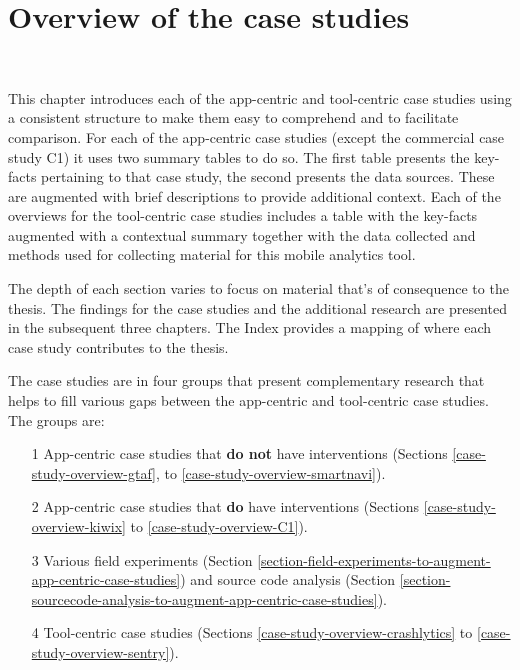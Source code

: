 \setchapterpreamble[u]{\margintoc}
\chapter{Overview of the case studies}~\label{chapter-case-studies-overview}

This chapter introduces each of the app-centric and tool-centric case studies using a consistent structure to make them easy to comprehend and to facilitate comparison. For each of the app-centric case studies (except the commercial case study C1) it uses two summary tables to do so. The first table presents the key-facts pertaining to that case study, the second presents the data sources. These are augmented with brief descriptions to provide additional context. Each of the overviews for the tool-centric case studies includes a table with the key-facts augmented with a contextual summary together with the data collected and methods used for collecting material for this mobile analytics tool.

The depth of each section varies to focus on material that's of consequence to the thesis. The findings for the case studies and the additional research are presented in the subsequent three chapters. The Index provides a mapping of where each case study contributes to the thesis. %

The case studies are in four groups that present complementary research that helps to fill various gaps between the app-centric and tool-centric case studies. The groups are: 
\begin{enumerate}
    \itemsep0em
    \item[1] App-centric case studies that \textbf{do not} have interventions (Sections \ref{case-study-overview-gtaf}, to \ref{case-study-overview-smartnavi}).
    \item[2] App-centric case studies that \textbf{do} have interventions (Sections \ref{case-study-overview-kiwix} to \ref{case-study-overview-C1}). 
    \item[3] Various field experiments (Section \ref{section-field-experiments-to-augment-app-centric-case-studies}) and source code analysis (Section \ref{section-sourcecode-analysis-to-augment-app-centric-case-studies}).
    \item[4] Tool-centric case studies (Sections \ref{case-study-overview-crashlytics} to \ref{case-study-overview-sentry}).
\end{enumerate}

